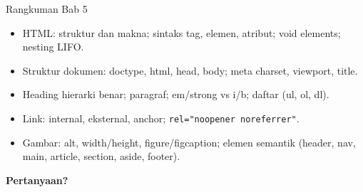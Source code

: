 \documentclass[handout]{beamer}
\begin{document}
\begin{frame}{Rangkuman Bab 5}
	\begin{itemize}
		\item HTML: struktur dan makna; sintaks tag, elemen, atribut; void elements; nesting LIFO.
		\item Struktur dokumen: doctype, html, head, body; meta charset, viewport, title.
		\item Heading hierarki benar; paragraf; em/strong vs i/b; daftar (ul, ol, dl).
		\item Link: internal, eksternal, anchor; \texttt{rel="noopener noreferrer"}.
		\item Gambar: alt, width/height, figure/figcaption; elemen semantik (header, nav, main, article, section, aside, footer).
	\end{itemize}
\end{frame}

\begin{frame}{}
	\centering
	\vfill
	\textbf{\Large Pertanyaan?}
	\vfill
\end{frame}
\end{document}
